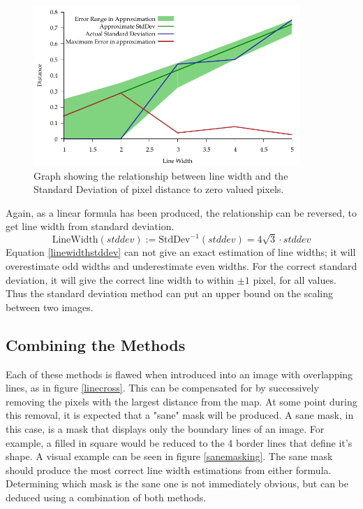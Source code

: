 \documentclass[../main.tex]{subfiles}
\begin{document}
    \begin{figure}[H]
      \centering
      \includegraphics[width=0.9\textwidth]{graphs/stddevwidth.pdf}
      \caption[
        Relationship between line width and standard deviation
      ]{Graph showing the relationship between line width and the Standard Deviation of pixel distance to zero valued pixels.}
      \label{stddevwidth}
    \end{figure}

    Again, as a linear formula has been produced, the relationship can be reversed, to get line width from standard deviation.
    \begin{equation}
      \text{LineWidth}(stddev) := \text{StdDev}^{-1}(stddev) = 4\sqrt{3}\cdot stddev
      \label{linewidthstddev}
    \end{equation}
    Equation \ref{linewidthstddev} can not give an exact estimation of line widths; it will overestimate odd widths and underestimate even widths.
    For the correct standard deviation, it will give the correct line width to within $\pm1$ pixel, for all values.
    Thus the standard deviation method can put an upper bound on the scaling between two images.

  \subsection{Combining the Methods}
    Each of these methods is flawed when introduced into an image with overlapping lines, as in figure \ref{linecross}.
    This can be compensated for by successively removing the pixels with the largest distance from the map. %
    At some point during this removal, it is expected that a "sane" mask will be produced.
    A sane mask, in this case, is a mask that displays only the boundary lines of an image.
    For example, a filled in square would be reduced to the 4 border lines that define it's shape.
    A visual example can be seen in figure \ref{sanemasking}.
    The sane mask should produce the most correct line width estimations from either formula.
    Determining which mask is the sane one is not immediately obvious, but can be deduced using a combination of both methods.
\end{document}
